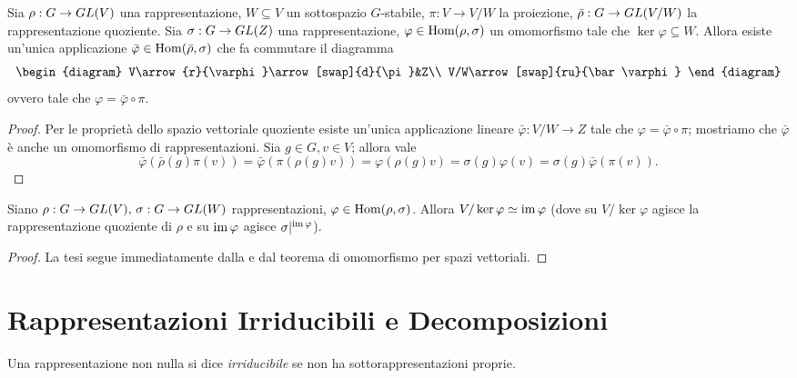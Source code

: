 \begin{proposition}
Sia $\rho:G\to GL(V)$ una rappresentazione, $W\subseteq V$ un sottospazio $G$-stabile, $\pi:V\to V/W$ la proiezione, $\bar\rho:G\to GL(V/W)$ la rappresentazione quoziente. Sia $\sigma:G\to GL(Z)$ una rappresentazione, $\varphi\in\operatorname{Hom}(\rho,\sigma)$ un omomorfismo tale che $\ker\varphi\subseteq W$. Allora esiste un'unica applicazione $\bar\varphi\in\operatorname{Hom}(\bar\rho,\sigma)$ che fa commutare il diagramma
$$
\begin{diagram}
V\arrow{r}{\varphi}\arrow[swap]{d}{\pi}&Z\\
V/W\arrow[swap]{ru}{\bar\varphi}
\end{diagram}
$$
ovvero tale che $\varphi=\bar\varphi\circ\pi$.
\end{proposition}
\begin{proof}
Per le proprietà dello spazio vettoriale quoziente esiste un'unica applicazione lineare $\bar\varphi:V/W\to Z$ tale che $\varphi=\bar\varphi\circ\pi$; mostriamo che $\bar\varphi$ è anche un omomorfismo di rappresentazioni. Sia $g\in G\comma v\in V$; allora vale
$$
\bar\varphi(\bar\rho(g)\pi(v))=\bar\varphi(\pi(\rho(g)v))=\varphi(\rho(g)v)=\sigma(g)\varphi(v)=\sigma(g)\bar\varphi(\pi(v)).
$$
\end{proof}

\begin{corollary}
Siano $\rho:G\to GL(V),\,\allowbreak\sigma:G\to GL(W)$ rappresentazioni, $\varphi\in\operatorname{Hom}(\rho,\sigma)$. Allora $V/\ker\varphi\simeq\operatorname{im}\varphi$ (dove su $V/\ker\varphi$ agisce la rappresentazione quoziente di $\rho$ e su $\operatorname{im}\varphi$ agisce $\sigma|^{\operatorname{im}\varphi}$).
\end{corollary}
\begin{proof}
La tesi segue immediatamente dalla  e dal teorema di omomorfismo per spazi vettoriali.
\end{proof}


\section{Rappresentazioni Irriducibili e Decomposizioni}\label{section-irreducible-representations}

\begin{definition}
Una rappresentazione non nulla si dice \emph{irriducibile} se non ha sottorappresentazioni proprie.
\end{definition}

